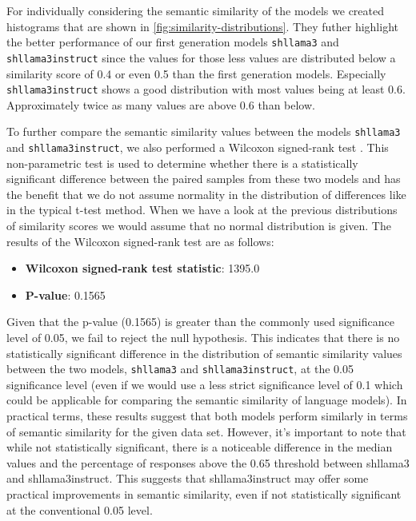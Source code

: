 For individually considering the semantic similarity of the models we created histograms that are shown in \cref{fig:similarity-distributions}. They futher highlight the better performance of our first generation models \texttt{shllama3} and \texttt{shllama3instruct} since the values for those less values are distributed below a similarity score of 0.4 or even 0.5 than the first generation models.
Especially \texttt{shllama3instruct} shows a good distribution with most values being at least 0.6. Approximately twice as many values are above 0.6 than below.

To further compare the semantic similarity values between the models \texttt{shllama3} and \texttt{shllama3instruct}, we also performed a Wilcoxon signed-rank test \cite{fahrmeir2024statistik, sheskin2011handbook}. This non-parametric test is used to determine whether there is a statistically significant difference between the paired samples from these two models and has the benefit that we do not assume normality in the distribution of differences like in the typical t-test method. When we have a look at the previous distributions of similarity scores we would assume that no normal distribution is given.
The results of the Wilcoxon signed-rank test are as follows:
\begin{itemize}
    \item \textbf{Wilcoxon signed-rank test statistic}: 1395.0
    \item \textbf{P-value}: 0.1565
\end{itemize}
Given that the p-value (0.1565) is greater than the commonly used significance level of 0.05, we fail to reject the null hypothesis. This indicates that there is no statistically significant difference in the distribution of semantic similarity values between the two models, \texttt{shllama3} and \texttt{shllama3instruct}, at the 0.05 significance level (even if we would use a less strict significance level of 0.1 which could be applicable for comparing the semantic similarity of language models).
In practical terms, these results suggest that both models perform similarly in terms of semantic similarity for the given data set.
However, it's important to note that while not statistically significant, there is a noticeable difference in the median values and the percentage of responses above the 0.65 threshold between shllama3 and shllama3instruct. This suggests that shllama3instruct may offer some practical improvements in semantic similarity, even if not statistically significant at the conventional 0.05 level.

